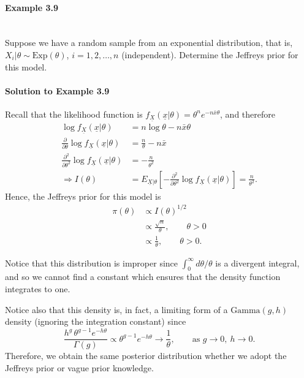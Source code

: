 \paragraph{Example 3.9}{~\\
Suppose we have a random sample from an exponential distribution, that \label{ex:38} is, $X_i|\theta\sim \text{Exp}(\theta)$, $i=1,2,\ldots,n$ (independent). Determine the Jeffreys prior for this model.

\paragraph{Solution to Example 3.9}{
    
    Recall that the likelihood function is
    $f_{\underline{X}}(\underline{x}|\theta)=\theta^n e^{-n\bar x\theta}$,
    and therefore 
    \begin{align*}
    \log f_{\underline{X}}(\underline{x}|\theta) &=n\log\theta -n\bar x\theta \\
    \frac{\partial}{\partial\theta} \log
    f_{\underline{X}}(\underline{x}|\theta) &=\frac{n}{\theta}-n\bar x \\
    \frac{\partial^2}{\partial\theta^2} \log
    f_{\underline{X}}(\underline{x}|\theta)&=-\frac{n}{\theta^2} \\ 
    \Rightarrow I(\theta) &=E_{\underline{X}|\theta}
    \left[-\frac{\partial^2}{\partial\theta^2} \log
    f_{\underline{X}}(\underline{x}|\theta)\right]=\frac{n}{\theta^2}.
    \end{align*}
    Hence, the Jeffreys prior for this model is
    \begin{align*}
    \pi(\theta)&\propto I(\theta)^{1/2} \\
    &\propto \frac{\sqrt{n}}{\theta},\quad\quad\theta>0 \\
    &\propto \frac{1}{\theta},\quad\quad\theta>0.
    \end{align*}
    
    
}

Notice that this distribution is improper since $\int_0^\infty d\theta/\theta$ is a divergent integral, and so we cannot find a constant which ensures that the density function integrates to one.

Notice also that this density is, in fact, a limiting form of a $\text{Gamma}(g,h)$ density (ignoring the integration constant) since
\begin{equation*}
\frac{h^g\,\theta^{g-1}e^{-h\theta}}{\Gamma(g)}\propto
\theta^{g-1}e^{-h\theta} 
\to \frac{1}{\theta},\quad\quad\text{as }g\to 0,~h\to 0.
\end{equation*}
Therefore, we obtain the same posterior distribution whether we adopt the Jeffreys prior or vague prior knowledge.}

